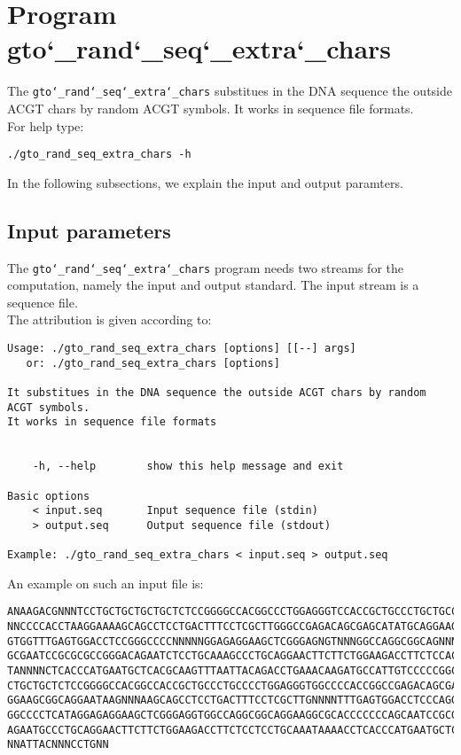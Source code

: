 \section{Program gto\char`_rand\char`_seq\char`_extra\char`_chars}
The \texttt{gto\char`_rand\char`_seq\char`_extra\char`_chars} substitues in the DNA sequence the outside ACGT chars by random ACGT symbols. It works in sequence file formats.\\
For help type:
\begin{lstlisting}
./gto_rand_seq_extra_chars -h
\end{lstlisting}
In the following subsections, we explain the input and output paramters.

\subsection*{Input parameters}

The \texttt{gto\char`_rand\char`_seq\char`_extra\char`_chars} program needs two streams for the computation,
namely the input and output standard. The input stream is a sequence file.\\
The attribution is given according to:
\begin{lstlisting}
Usage: ./gto_rand_seq_extra_chars [options] [[--] args]
   or: ./gto_rand_seq_extra_chars [options]

It substitues in the DNA sequence the outside ACGT chars by random ACGT symbols.
It works in sequence file formats


    -h, --help        show this help message and exit

Basic options
    < input.seq       Input sequence file (stdin)
    > output.seq      Output sequence file (stdout)

Example: ./gto_rand_seq_extra_chars < input.seq > output.seq
\end{lstlisting}
An example on such an input file is:
\begin{lstlisting}
ANAAGACGNNNTCCTGCTGCTGCTGCTCTCCGGGGCCACGGCCCTGGAGGGTCCACCGCTGCCCTGCTGCCATTGTCCCC
NNCCCCACCTAAGGAAAAGCAGCCTCCTGACTTTCCTCGCTTGGGCCGAGACAGCGAGCATATGCAGGAAGCGGCAGGAA
GTGGTTTGAGTGGACCTCCGGGCCCCNNNNNGGAGAGGAAGCTCGGGAGNGTNNNGGCCAGGCGGCAGNNNNCCAGTGCC
GCGAATCCGCGCGCCGGGACAGAATCTCCTGCAAAGCCCTGCAGGAACTTCTTCTGGAAGACCTTCTCCACCCCCCCAGC
TANNNNCTCACCCATGAATGCTCACGCAAGTTTAATTACAGACCTGAAACAAGATGCCATTGTCCCCCGGCCTCCTGCTG
CTGCTGCTCTCCGGGGCCACGGCCACCGCTGCCCTGCCCCTGGAGGGTGGCCCCACCGGCCGAGACAGCGAGCATATGCA
GGAAGCGGCAGGAATAAGNNNAAGCAGCCTCCTGACTTTCCTCGCTTGNNNNTTTGAGTGGACCTCCCAGGCCAGTGCCG
GGCCCCTCATAGGAGAGGAAGCTCGGGAGGTGGCCAGGCGGCAGGAAGGCGCACCCCCCCAGCAATCCGCGCGCCGGGAC
AGAATGCCCTGCAGGAACTTCTTCTGGAAGACCTTCTCCTCCTGCAAATAAAACCTCACCCATGAATGCTCACGCAAGTT
NNATTACNNNCCTGNN
\end{lstlisting}

